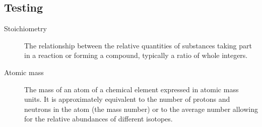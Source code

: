 \documentclass{article}
\begin{document}
\subsection{Testing}
\label{Class Relationships}
\begin{description}
\item[Stoichiometry]
The relationship between the relative quantities of substances taking part in a reaction or forming a compound, typically a ratio of whole integers.
\item[Atomic mass]
The mass of an atom of a chemical element expressed in atomic mass units. It is approximately equivalent to the number of protons and neutrons in the atom (the mass number) or to the average number allowing for the relative abundances of different isotopes. 
\end{description} 

\pagebreak






\end{document}
